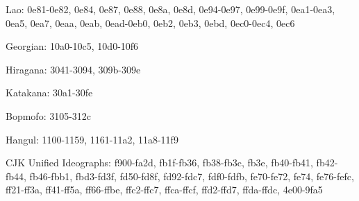 Lao:
0e81-0e82, 0e84, 0e87, 0e88, 0e8a, 0e8d, 0e94-0e97, 0e99-0e9f, 0ea1-0ea3, 0ea5,
0ea7, 0eaa, 0eab, 0ead-0eb0, 0eb2, 0eb3, 0ebd, 0ec0-0ec4, 0ec6

Georgian:
10a0-10c5, 10d0-10f6

Hiragana:
3041-3094, 309b-309e

Katakana:
30a1-30fe

Bopmofo:
3105-312c

Hangul:
1100-1159, 1161-11a2, 11a8-11f9

CJK Unified Ideographs:
f900-fa2d, fb1f-fb36, fb38-fb3c, fb3e, fb40-fb41, fb42-fb44, fb46-fbb1,
fbd3-fd3f, fd50-fd8f, fd92-fdc7, fdf0-fdfb, fe70-fe72, fe74, fe76-fefc,
ff21-ff3a, ff41-ff5a, ff66-ffbe, ffc2-ffc7, ffca-ffcf, ffd2-ffd7, ffda-ffdc,
4e00-9fa5
